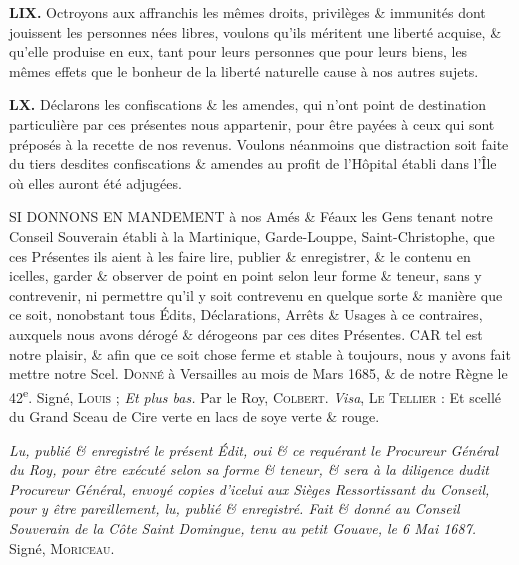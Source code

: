 \documentclass[french,twoside]{book} %
\newif\ifdev
\renewcommand{\LettrineFontHook}{\color{rubric}}
\newcommand{\initialiv}[2]{%
  \let\oldLFH\LettrineFontHook
  \IfSubStr{Q}{#1}{
    \lettrine[lines=4, lhang=0.2, loversize=-0.1, lraise=0.2]{\smash{#1}}{#2}
  }{\IfSubStr{É}{#1}{
    \lettrine[lines=4, lhang=0.2, loversize=-0, lraise=0]{\smash{#1}}{#2}
  }{\IfSubStr{ÀÂ}{#1}{
    \lettrine[lines=4, lhang=0.2, loversize=-0, lraise=0, slope=0.6em]{\smash{#1}}{#2}
  }{\IfSubStr{A}{#1}{
    \lettrine[lines=4, lhang=0.2, loversize=0.2, slope=0.6em]{\smash{#1}}{#2}
  }{\IfSubStr{V}{#1}{
    \lettrine[lines=4, lhang=0.2, loversize=0.2, slope=-0.5em]{\smash{#1}}{#2}
  }{
    \lettrine[lines=4, lhang=0.2, loversize=0.2]{\smash{#1}}{#2}
  }}}}}
  \let\LettrineFontHook\oldLFH
}
\newcommand{\labelchar}[1]{{\color{rubric}\bf #1}}
\renewcommand{\LettrineFontHook}{\bfseries\color{rubric}}
\begin{document}
\labelchar{LIX.} Octroyons aux affranchis les mêmes droits, privilèges \& immunités dont jouissent les personnes nées libres, voulons qu’ils méritent une liberté acquise, \& qu’elle produise en eux, tant pour leurs personnes que pour leurs biens, les mêmes effets que le bonheur de la liberté naturelle cause à nos autres sujets.\par
\labelchar{LX.} Déclarons les confiscations \& les amendes, qui n’ont point de destination particulière par ces présentes nous appartenir, pour être payées à ceux qui sont préposés à la recette de nos revenus. Voulons néanmoins que distraction soit faite du tiers desdites confiscations \& amendes au profit de l’Hôpital établi dans l’Île où elles auront été adjugées.\par
SI DONNONS EN MANDEMENT à nos Amés \& Féaux les Gens tenant notre Conseil Souverain établi à la Martinique, Garde-Louppe, Saint-Christophe, que ces Présentes ils aient à les faire lire, publier \& enregistrer, \& le contenu en icelles, garder \& observer de point en point selon leur forme \& teneur, sans y contrevenir, ni permettre qu’il y soit contrevenu en quelque sorte \& manière que ce soit, nonobstant tous Édits, Déclarations, Arrêts \& Usages à ce contraires, auxquels nous avons dérogé \& dérogeons par ces dites Présentes. CAR tel est notre plaisir, \& afin que ce soit chose ferme et stable à toujours, nous y avons fait mettre notre Scel. {\scshape Donné} à Versailles au mois de Mars 1685, \& de notre Règne le 42\textsuperscript{e}. Signé, {\scshape Louis} ; \emph{Et plus bas.} Par le Roy, {\scshape Colbert}. \emph{Visa}, {\scshape Le Tellier} : Et scellé du Grand Sceau de Cire verte en lacs de soye verte \& rouge.\par
\emph{Lu, publié \& enregistré le présent Édit, oui \& ce requérant le Procureur Général du Roy, pour être exécuté selon sa forme \& teneur, \& sera à la diligence dudit Procureur Général, envoyé copies d’icelui aux Sièges Ressortissant du Conseil, pour y être pareillement, lu, publié \& enregistré. Fait \& donné au Conseil Souverain de la Côte Saint Domingue, tenu au petit Gouave, le 6 Mai 1687.} Signé, {\scshape Moriceau}.
 


\ifbooklet
  \newpage\null\thispagestyle{empty}\newpage
\fi

\ifdev %
\fontname\font — \textsc{Les règles du jeu}\par
(\hyperref[utopie]{\underline{Lien}})\par
\noindent \initialiv{A}{lors là}\blindtext\par
\noindent \initialiv{À}{ la bonheur des dames}\blindtext\par
\noindent \initialiv{É}{tonnez-le}\blindtext\par
\noindent \initialiv{Q}{ualitativement}\blindtext\par
\noindent \initialiv{V}{aloriser}\blindtext\par
\Blindtext
\phantomsection
\label{utopie}
\Blinddocument
\fi
\end{document}
